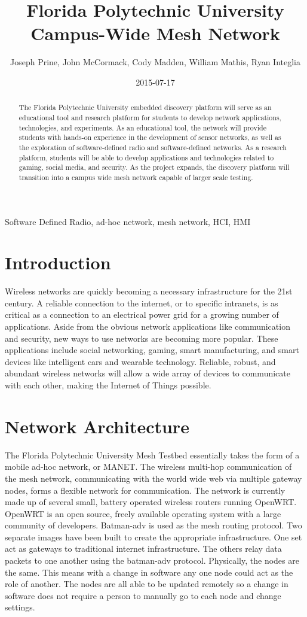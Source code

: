 \documentclass{IEEEtran}
\title{Florida Polytechnic University Campus-Wide Mesh Network}
\date{2015-07-17}
\author{Joseph Prine, John McCormack, Cody Madden, William Mathis, Ryan Integlia}
\begin{document}
\maketitle

\begin{abstract}
The Florida Polytechnic University embedded discovery platform will serve as an educational tool and research platform for students to develop network applications, technologies, and experiments.  As an educational tool, the network will provide students with hands-on experience in the development of sensor networks, as well as the exploration of software-defined radio and software-defined networks.  As a research platform, students will be able to develop applications and technologies related to gaming, social media, and security. As the project expands, the discovery platform will transition into a campus wide mesh network capable of larger scale testing. 
\end{abstract}
\begin{IEEEkeywords}
Software Defined Radio, ad-hoc network, mesh network, HCI, HMI
\end{IEEEkeywords}


\section{Introduction}
Wireless networks are quickly becoming a necessary infrastructure for the 21st century.  A reliable connection to the internet, or to specific intranets, is as critical as a connection to an electrical power grid for a growing number of applications.  Aside from the obvious network applications like communication and security, new ways to use networks are becoming more popular.  These applications include social networking, gaming, smart manufacturing, and smart devices like intelligent cars and wearable technology. Reliable, robust, and abundant wireless networks will allow a wide array of devices to communicate with each other, making the Internet of Things possible.
\section{Network Architecture}
The Florida Polytechnic University Mesh Testbed essentially takes the form of a mobile ad-hoc network, or MANET.  The wireless multi-hop communication of the mesh network, communicating with the world wide web via multiple gateway nodes, forms a flexible network for communication. The network is currently made up of several small, battery operated wireless routers running OpenWRT. OpenWRT is an open source, freely available operating system with a large community of developers. Batman-adv is used as the mesh routing protocol. Two separate images have been built to create the appropriate infrastructure. One set act as gateways to traditional internet infrastructure. The others relay data packets to one another using the batman-adv protocol. Physically, the nodes are the same. This means with a change in software any one node could act as the role of another. The nodes are all able to be updated remotely so a change in software does not require a person to manually go to each node and change settings. 
\end{document}
